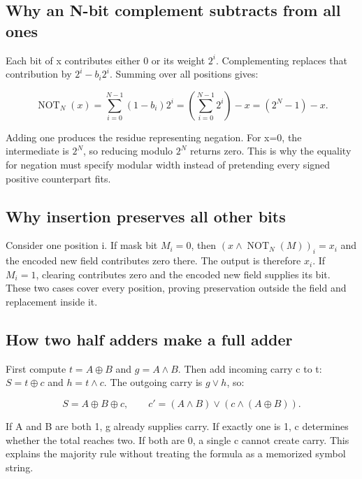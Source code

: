 \subsection{Why an N-bit complement subtracts from all ones}\label{01-foundations-i-ch011-why-an-n-bit-complement-subtracts-from-all-ones}

Each bit of x contributes either 0 or its weight \(2^i\). Complementing replaces that contribution by \(2^i-b_i2^i\). Summing over all positions gives:

\[
\operatorname{NOT}_N(x)=\sum_{i=0}^{N-1}(1-b_i)2^i
=\left(\sum_{i=0}^{N-1}2^i\right)-x=(2^N-1)-x.
\]

Adding one produces the residue representing negation. For x=0, the intermediate is \(2^N\), so reducing modulo \(2^N\) returns zero. This is why the equality for negation must specify modular width instead of pretending every signed positive counterpart fits.

\subsection{Why insertion preserves all other bits}\label{01-foundations-i-ch011-why-insertion-preserves-all-other-bits}

Consider one position i. If mask bit \(M_i=0\), then \((x\land\operatorname{NOT}_N(M))_i=x_i\) and the encoded new field contributes zero there. The output is therefore \(x_i\). If \(M_i=1\), clearing contributes zero and the encoded new field supplies its bit. These two cases cover every position, proving preservation outside the field and replacement inside it.

\subsection{How two half adders make a full adder}\label{01-foundations-i-ch011-how-two-half-adders-make-a-full-adder}

First compute \(t=A\oplus B\) and \(g=A\land B\). Then add incoming carry c to t: \(S=t\oplus c\) and \(h=t\land c\). The outgoing carry is \(g\lor h\), so:

\[
S=A\oplus B\oplus c,\qquad c'=(A\land B)\lor(c\land(A\oplus B)).
\]

If A and B are both 1, g already supplies carry. If exactly one is 1, c determines whether the total reaches two. If both are 0, a single c cannot create carry. This explains the majority rule without treating the formula as a memorized symbol string.


